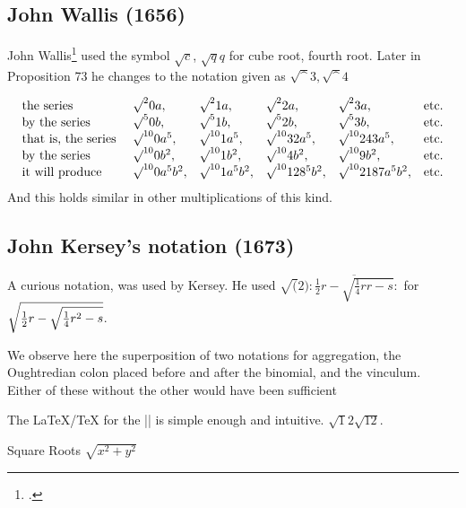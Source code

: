 {\subsection*{John Wallis (1656)}

John Wallis\footcite{wallis} used the symbol $\surd c$, $\surd qq$ for cube root, fourth root. Later in Proposition 73 he changes to the notation given as $\surd^3, \surd^4$


\begin{gather}
\begin{array}{@{}llll l l@{}}
\text{the series }          & \surd^2 0a,        &\surd^2 1a,         &\surd^2 2a,         &\surd^2 3a,           &\text{etc.}\\
\text{by the series }       & \surd^5 0b,        &\surd^5 1b,         &\surd^5 2b,         &\surd^5 3b,           &\text{etc.}\\
\text{that is, the series } & \surd^{10}0a^5,    & \surd^{10} 1a^5,   &\surd^{10}32a^5,    &\surd^{10} 243a^5,    &\text{etc.}\\
\text{by the series }       & \surd^{10}0b^2,    &\surd^{10} 1b^2,    &\surd^{10}4b^2,     &\surd^{10} 9b^2,      &\text{etc.}\\
\text{it will produce}      & \surd^{10}0a^5b^2, &\surd^{10} 1a^5b^2, &\surd^{10}128^5b^2, &\surd^{10}2187a^5b^2, &\text{etc.}\\ 
\end{array}
\end{gather}
And this holds similar in other multiplications of this kind.

\subsection*{John Kersey's notation (1673)}

A curious notation, was used by Kersey. He used $\surd(2)\!\colon\!\!\!\overline{\frac{1}{2}r - \sqrt{\frac{1}{4}rr-s}}\colon$  for 
$\sqrt{%
  \frac{1}{2}r-\sqrt{%
                     \frac{1}{4}r^2-s%
                    }%
      }$. 

We observe here the superposition of two notations for aggregation, the
Oughtredian colon placed before and after the binomial, and the vinculum. Either of these without the other would have been sufficient



The LaTeX/TeX for the |\sqrt|  is simple enough and intuitive. $\surd12 \sqrt{12}$.

\begin{texexample}{Square Roots}{}
$\sqrt{x^2+y^2}$
\end{texexample}




}
